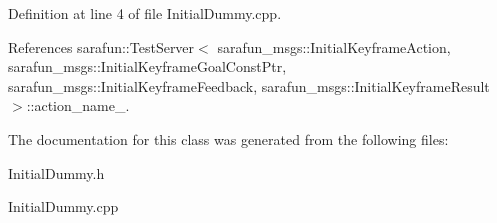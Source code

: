 Definition at line 4 of file Initial\-Dummy.\-cpp.



References sarafun\-::\-Test\-Server$<$ sarafun\-\_\-msgs\-::\-Initial\-Keyframe\-Action, sarafun\-\_\-msgs\-::\-Initial\-Keyframe\-Goal\-Const\-Ptr, sarafun\-\_\-msgs\-::\-Initial\-Keyframe\-Feedback, sarafun\-\_\-msgs\-::\-Initial\-Keyframe\-Result $>$\-::action\-\_\-name\-\_\-.



The documentation for this class was generated from the following files\-:\begin{DoxyCompactItemize}
\item 
Initial\-Dummy.\-h\item 
Initial\-Dummy.\-cpp\end{DoxyCompactItemize}
